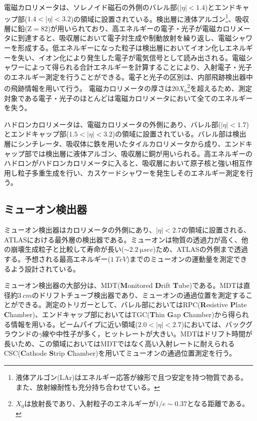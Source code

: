 電磁カロリメータは、ソレノイド磁石の外側のバレル部($|\eta|<1.4$)とエンドキャップ部($1.4<|\eta|<3.2$)の領域に設置されている。検出層に液体アルゴン\footnote{液体アルゴン(LAr)はエネルギー応答が線形で且つ安定を持つ物質である。また、放射線耐性も充分持ち合わせている。}、吸収層に鉛($\mathrm{Z}=82$)が用いられており、高エネルギーの電子・光子が電磁カロリメータに到達すると、吸収層において電子対生成や制動放射を繰り返し、電磁シャワーを形成する。低エネルギーになった粒子は検出層においてイオン化しエネルギーを失い、イオン化により発生した電子が電気信号として読み出される。電磁シャワーによって得られる合計エネルギーを計算することにより、入射電子・光子のエネルギー測定を行うことができる。電子と光子の区別は、内部飛跡検出器中の飛跡情報を用いて行う。
電磁カロリメータの厚さは$20X_0$\footnote{$X_0$は放射長であり、入射粒子のエネルギーが$1/e\sim0.37$となる距離である。}を超えるため、測定対象である電子・光子のほとんどは電磁カロリメータにおいて全てのエネルギーを失う。

ハドロンカロリメータは、電磁カロリメータの外側にあり、バレル部($|\eta|<1.7$)とエンドキャップ部($1.5<|\eta|<3.2$)の領域に設置されている。バレル部は検出層にシンチレータ、吸収体に鉄を用いたタイルカロリメータから成り、エンドキャップ部では検出層に液体アルゴン、吸収層に銅が用いられる。高エネルギーのハドロンがハドロンカロリメータに入ると、吸収層において原子核と強い相互作用し粒子多重生成を行い、カスケードシャワーを発生しそのエネルギー測定を行う。



\subsection{ミューオン検出器}
\label{sec:mumu}
ミューオン検出器はカロリメータの外側にあり、$|\eta|<2.7$の領域に設置される、ATLASにおける最外層の検出器である。ミューオンは物質の透過力が高く、他の崩壊生成粒子と比較して寿命が長い($\sim 2.2\ \si{\micro sec}$)ため、ATLASの外側まで透過する。予想される最高エネルギー($1\ \si{TeV}$)までのミューオンの運動量を測定できるよう設計されている。

ミューオン検出器の大部分は、MDT(\textbf{M}onitored \textbf{D}rift \textbf{T}ube)である。MDTは直径約$3\ \si{cm}$のドリフトチューブ検出器であり、ミューオンの通過位置を測定することができる。測定のトリガーとして、バレル部においてはRPC(\textbf{R}esistive \textbf{P}late \textbf{C}hamber)、エンドキャップ部においてはTGC(\textbf{T}hin \textbf{G}ap \textbf{C}hamber)から得られる情報を用いる。ビームパイプに近い領域($2.0<|\eta|<2.7$)においては、バックグラウンドの$\gamma$線や中性子が多く，ヒットレートが大きい。MDTはドリフト時間が長いため、この領域においてはMDTではなく高い入射レートに耐えられるCSC(\textbf{C}athode \textbf{S}trip \textbf{C}hamber)を用いてミューオンの通過位置測定を行う。







